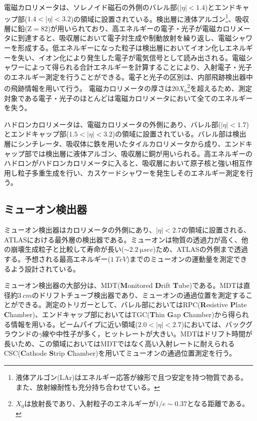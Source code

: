 電磁カロリメータは、ソレノイド磁石の外側のバレル部($|\eta|<1.4$)とエンドキャップ部($1.4<|\eta|<3.2$)の領域に設置されている。検出層に液体アルゴン\footnote{液体アルゴン(LAr)はエネルギー応答が線形で且つ安定を持つ物質である。また、放射線耐性も充分持ち合わせている。}、吸収層に鉛($\mathrm{Z}=82$)が用いられており、高エネルギーの電子・光子が電磁カロリメータに到達すると、吸収層において電子対生成や制動放射を繰り返し、電磁シャワーを形成する。低エネルギーになった粒子は検出層においてイオン化しエネルギーを失い、イオン化により発生した電子が電気信号として読み出される。電磁シャワーによって得られる合計エネルギーを計算することにより、入射電子・光子のエネルギー測定を行うことができる。電子と光子の区別は、内部飛跡検出器中の飛跡情報を用いて行う。
電磁カロリメータの厚さは$20X_0$\footnote{$X_0$は放射長であり、入射粒子のエネルギーが$1/e\sim0.37$となる距離である。}を超えるため、測定対象である電子・光子のほとんどは電磁カロリメータにおいて全てのエネルギーを失う。

ハドロンカロリメータは、電磁カロリメータの外側にあり、バレル部($|\eta|<1.7$)とエンドキャップ部($1.5<|\eta|<3.2$)の領域に設置されている。バレル部は検出層にシンチレータ、吸収体に鉄を用いたタイルカロリメータから成り、エンドキャップ部では検出層に液体アルゴン、吸収層に銅が用いられる。高エネルギーのハドロンがハドロンカロリメータに入ると、吸収層において原子核と強い相互作用し粒子多重生成を行い、カスケードシャワーを発生しそのエネルギー測定を行う。



\subsection{ミューオン検出器}
\label{sec:mumu}
ミューオン検出器はカロリメータの外側にあり、$|\eta|<2.7$の領域に設置される、ATLASにおける最外層の検出器である。ミューオンは物質の透過力が高く、他の崩壊生成粒子と比較して寿命が長い($\sim 2.2\ \si{\micro sec}$)ため、ATLASの外側まで透過する。予想される最高エネルギー($1\ \si{TeV}$)までのミューオンの運動量を測定できるよう設計されている。

ミューオン検出器の大部分は、MDT(\textbf{M}onitored \textbf{D}rift \textbf{T}ube)である。MDTは直径約$3\ \si{cm}$のドリフトチューブ検出器であり、ミューオンの通過位置を測定することができる。測定のトリガーとして、バレル部においてはRPC(\textbf{R}esistive \textbf{P}late \textbf{C}hamber)、エンドキャップ部においてはTGC(\textbf{T}hin \textbf{G}ap \textbf{C}hamber)から得られる情報を用いる。ビームパイプに近い領域($2.0<|\eta|<2.7$)においては、バックグラウンドの$\gamma$線や中性子が多く，ヒットレートが大きい。MDTはドリフト時間が長いため、この領域においてはMDTではなく高い入射レートに耐えられるCSC(\textbf{C}athode \textbf{S}trip \textbf{C}hamber)を用いてミューオンの通過位置測定を行う。







